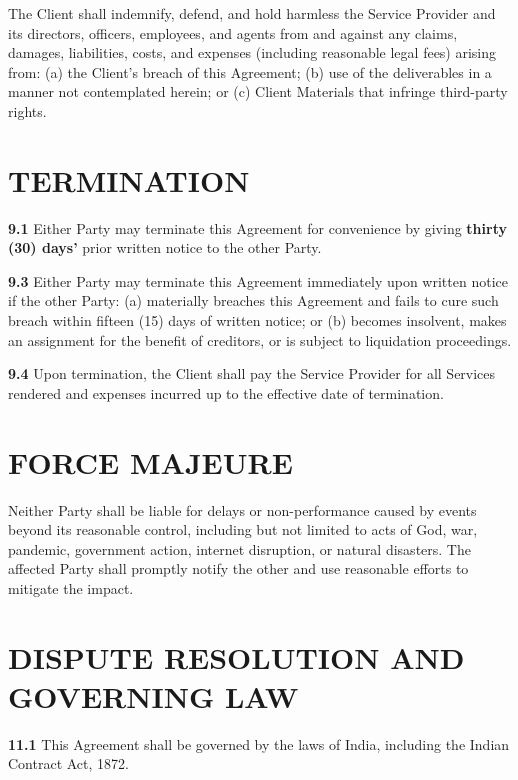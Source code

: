 \documentclass[10pt]{article}
\begin{document}
The Client shall indemnify, defend, and hold harmless the Service Provider and its directors, officers, employees, and agents from and against any claims, damages, liabilities, costs, and expenses (including reasonable legal fees) arising from: (a) the Client's breach of this Agreement; (b) use of the deliverables in a manner not contemplated herein; or (c) Client Materials that infringe third-party rights.

\section{TERMINATION}

\textbf{9.1} Either Party may terminate this Agreement for convenience by giving \textbf{thirty (30) days'} prior written notice to the other Party.


\textbf{9.3} Either Party may terminate this Agreement immediately upon written notice if the other Party: (a) materially breaches this Agreement and fails to cure such breach within fifteen (15) days of written notice; or (b) becomes insolvent, makes an assignment for the benefit of creditors, or is subject to liquidation proceedings.

\textbf{9.4} Upon termination, the Client shall pay the Service Provider for all Services rendered and expenses incurred up to the effective date of termination.

\section{FORCE MAJEURE}

Neither Party shall be liable for delays or non-performance caused by events beyond its reasonable control, including but not limited to acts of God, war, pandemic, government action, internet disruption, or natural disasters. The affected Party shall promptly notify the other and use reasonable efforts to mitigate the impact.

\section{DISPUTE RESOLUTION AND GOVERNING LAW}

\textbf{11.1} This Agreement shall be governed by the laws of India, including the Indian Contract Act, 1872.
\end{document}
